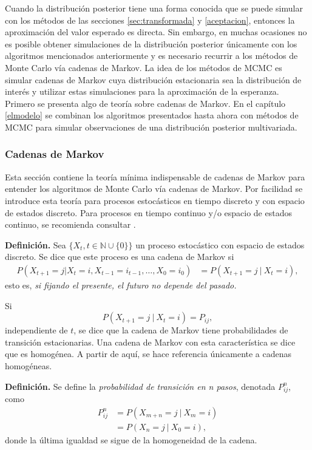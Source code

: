 \documentclass[11pt,a4paper]{article}
\begin{document}
Cuando la distribución posterior tiene una forma conocida que se puede simular con los métodos de las secciones \ref{sec:transformada} y \ref{aceptacion}, entonces la aproximación del valor esperado es directa. Sin embargo, en muchas ocasiones no es posible obtener simulaciones de la distribución posterior únicamente con los algoritmos mencionados anteriormente y es necesario recurrir a los métodos de Monte Carlo vía cadenas de Markov. La idea de los métodos de MCMC es simular cadenas de Markov cuya distribución estacionaria sea la distribución de interés y utilizar estas simulaciones para la aproximación de la esperanza. Primero se presenta algo de teoría sobre cadenas de Markov. En el capítulo \ref{elmodelo} se combinan los algoritmos presentados hasta ahora con métodos de MCMC para simular observaciones de una distribución posterior multivariada.

\newpage

\subsubsection*{Cadenas de Markov}
Esta sección contiene la teoría mínima indispensable de cadenas de Markov para entender los algoritmos de Monte Carlo vía cadenas de Markov. Por facilidad se introduce esta teoría para procesos estocásticos en tiempo discreto y con espacio de estados discreto. Para procesos en tiempo continuo y/o espacio de estados continuo, se recomienda consultar \citet{ross}.

\textbf{Definición.} Sea $\lbrace X_t, t \in \mathbb{N} \cup \lbrace 0 \rbrace \rbrace$ un proceso estocástico con espacio de estados discreto. Se dice que este proceso es una cadena de Markov si 
\begin{align*}
P\left( X_{t+1} = j | X_t = i, X_{t-1} = i_{t-1}, \dots, X_0 = i_0\right) &= P\left( X_{t+1} = j \ | \ X_t = i\right),
\end{align*}
esto es, \textit{si fijando el presente, el futuro no depende del pasado.}

Si $$P\left( X_{t+1} = j \ | \ X_t = i\right) = P_{ij},$$ independiente de $t$, se dice que la cadena de Markov tiene probabilidades de transición estacionarias. Una cadena de Markov con esta característica se dice que es homogénea. A partir de aquí, se hace referencia únicamente a cadenas homogéneas.

\textbf{Definición.} Se define la \textit{probabilidad de transición en n pasos}, denotada $P_{ij}^n$, como
\begin{align*}
P_{ij}^n &= P\left( X_{m+n} = j \ | \ X_{m} = i\right)\\
&= P\left( X_n = j \ | \ X_0 = i \right),
\end{align*}
donde la última igualdad se sigue de la homogeneidad de la cadena.
\end{document}
